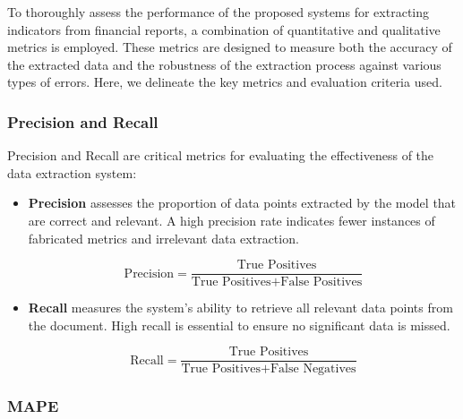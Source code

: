 \documentclass[english, 12pt, a4paper, elec, utf8, a-2b, online]{aaltothesis}
\begin{document}
To thoroughly assess the performance of the proposed systems for extracting indicators from financial reports, a combination of quantitative and qualitative metrics is employed.
These metrics are designed to measure both the accuracy of the extracted data and the robustness of the extraction process against various types of errors.
Here, we delineate the key metrics and evaluation criteria used.

\subsubsection{Precision and Recall}
Precision and Recall are critical metrics for evaluating the effectiveness of the data extraction system:
\begin{itemize}
    \item \textbf{Precision} assesses the proportion of data points extracted by the model that are correct and relevant. A high precision rate indicates fewer instances of fabricated metrics and irrelevant data extraction.

    \begin{equation}
        \text{Precision} = \frac{\text{True Positives}}{\text{True Positives} + \text{False Positives}}
    \end{equation}

    \item \textbf{Recall} measures the system's ability to retrieve all relevant data points from the document. High recall is essential to ensure no significant data is missed.

    \begin{equation}
        \text{Recall} = \frac{\text{True Positives}}{\text{True Positives} + \text{False Negatives}}
    \end{equation}
\end{itemize}




\subsubsection{\ac{MAPE}}
\end{document}
